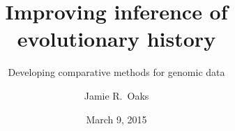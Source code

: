 \title[Improving inference of evolutionary history]{Improving inference of evolutionary history}
\subtitle{Developing comparative methods for genomic data}

\author[J.\ Oaks]{
    Jamie R.\ Oaks\inst{}
}

\date{March 9, 2015}
